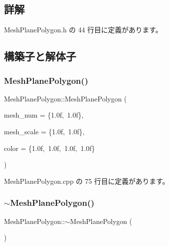 \subsection{詳解}


 Mesh\+Plane\+Polygon.\+h の 44 行目に定義があります。



\subsection{構築子と解体子}
\mbox{\label{class_mesh_plane_polygon_a7db07104974799895b42997c71ba8d3e}} 
\subsubsection{\texorpdfstring{Mesh\+Plane\+Polygon()}{MeshPlanePolygon()}}
{\footnotesize\ttfamily Mesh\+Plane\+Polygon\+::\+Mesh\+Plane\+Polygon (\begin{DoxyParamCaption}\item[{\mbox{\hyperlink{_vector3_d_8h_a5ef6e95dfc5f9d3820b71772d99bbc25}{Vec2}}}]{mesh\+\_\+num = {\ttfamily \{1.0f,~1.0f\}},  }\item[{\mbox{\hyperlink{_vector3_d_8h_a5ef6e95dfc5f9d3820b71772d99bbc25}{Vec2}}}]{mesh\+\_\+scale = {\ttfamily \{1.0f,~1.0f\}},  }\item[{\mbox{\hyperlink{_vector3_d_8h_a680c30c4a07d86fe763c7e01169cd6cc}{X\+Color4}}}]{color = {\ttfamily \{1.0f,~1.0f,~1.0f,~1.0f\}} }\end{DoxyParamCaption})}



 Mesh\+Plane\+Polygon.\+cpp の 75 行目に定義があります。

\mbox{\label{class_mesh_plane_polygon_a6c76a24c3f35cd9a77e6947c22fa4c3d}} 
\subsubsection{\texorpdfstring{$\sim$\+Mesh\+Plane\+Polygon()}{~MeshPlanePolygon()}}
{\footnotesize\ttfamily Mesh\+Plane\+Polygon\+::$\sim$\+Mesh\+Plane\+Polygon (\begin{DoxyParamCaption}{ }\end{DoxyParamCaption})\hspace{0.3cm}{\ttfamily [virtual]}}



